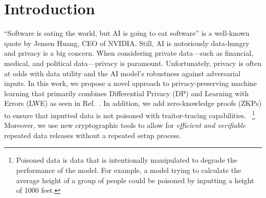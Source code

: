 \section{Introduction}
    ``Software is eating the world, but AI is going to eat software'' is a well-known quote by Jensen Huang, CEO of NVIDIA.
    Still, AI is notoriously data-hungry and privacy is a big concern.
    When considering private data---such as financial, medical, and political data---privacy is paramount.
    Unfortunately, privacy is often at odds with data utility and the AI model's robustness against adversarial inputs.
    In this work, we propose a novel approach to privacy-preserving machine learning that primarily combines Differential Privacy (DP) and Learning with Errors (LWE) as seen in Ref.~\cite{stevens2021efficientdifferentiallyprivatesecure}.
    In addition, we add zero-knowledge proofs (ZKPs) to ensure that inputted data is not poisoned with traitor-tracing capabilities.
    ~\footnote{Poisoned data is data that is intentionally manipulated to degrade the performance of the model.
    For example, a model trying to calculate the average height of a group of people could be poisoned by inputting a height of 1000 feet.}
    Moreover, we use new cryptographic tools to allow for \emph{efficient and verifiable} repeated data releases without a repeated setup process.


